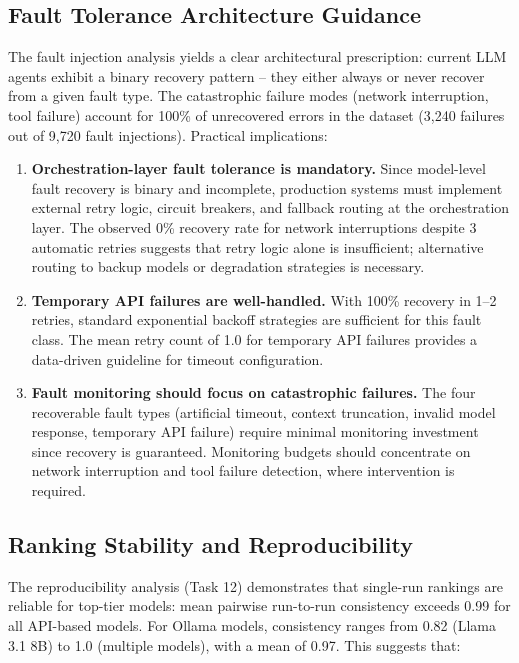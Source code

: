 \subsection{Fault Tolerance Architecture Guidance}

The fault injection analysis yields a clear architectural prescription: current LLM agents exhibit a binary recovery pattern -- they either always or never recover from a given fault type. The catastrophic failure modes (network interruption, tool failure) account for 100\% of unrecovered errors in the dataset (3,240 failures out of 9,720 fault injections). Practical implications:

\begin{enumerate}
    \item \textbf{Orchestration-layer fault tolerance is mandatory.} Since model-level fault recovery is binary and incomplete, production systems must implement external retry logic, circuit breakers, and fallback routing at the orchestration layer. The observed 0\% recovery rate for network interruptions despite 3 automatic retries suggests that retry logic alone is insufficient; alternative routing to backup models or degradation strategies is necessary.

    \item \textbf{Temporary API failures are well-handled.} With 100\% recovery in 1--2 retries, standard exponential backoff strategies are sufficient for this fault class. The mean retry count of 1.0 for temporary API failures provides a data-driven guideline for timeout configuration.

    \item \textbf{Fault monitoring should focus on catastrophic failures.} The four recoverable fault types (artificial timeout, context truncation, invalid model response, temporary API failure) require minimal monitoring investment since recovery is guaranteed. Monitoring budgets should concentrate on network interruption and tool failure detection, where intervention is required.
\end{enumerate}

\subsection{Ranking Stability and Reproducibility}

The reproducibility analysis (Task 12) demonstrates that single-run rankings are reliable for top-tier models: mean pairwise run-to-run consistency exceeds 0.99 for all API-based models. For Ollama models, consistency ranges from 0.82 (Llama 3.1 8B) to 1.0 (multiple models), with a mean of 0.97. This suggests that:

